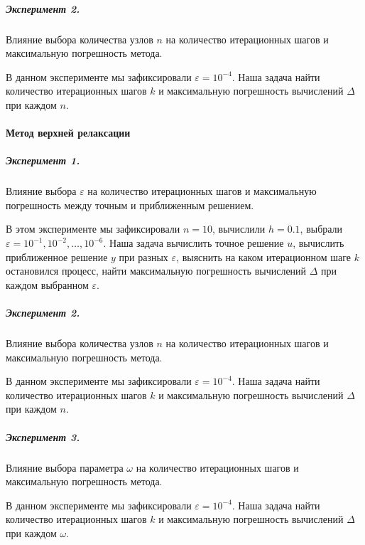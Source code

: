 \subparagraph{Эксперимент 2.}

Влияние выбора количества узлов $n$ на количество итерационных шагов и максимальную погрешность метода.

В данном эксперименте мы зафиксировали $\varepsilon = 10^{-4}$. Наша задача найти количество итерационных шагов $k$ и максимальную погрешность вычислений $\Delta$ при каждом $n$.



\newpage
\paragraph{Метод верхней релаксации}

\subparagraph{Эксперимент 1.}

Влияние выбора $\varepsilon$ на количество итерационных шагов и максимальную погрешность между точным и приближенным решением.

В этом эксперименте мы зафиксировали $n = 10$, вычислили $h=0.1$, выбрали $\varepsilon = 10^{-1}, 10^{-2}, \dots, 10^{-6}$. Наша задача вычислить точное решение $u$, вычислить приближенное решение $y$ при разных $\varepsilon$, выяснить на каком итерационном шаге $k$  остановился процесс, найти максимальную погрешность вычислений $\Delta$ при каждом выбранном $\varepsilon$.



\subparagraph{Эксперимент 2.}

Влияние выбора количества узлов $n$ на количество итерационных шагов и максимальную погрешность метода.

В данном эксперименте мы зафиксировали $\varepsilon = 10^{-4}$. Наша задача найти количество итерационных шагов $k$ и максимальную погрешность вычислений $\Delta$ при каждом $n$.



\subparagraph{Эксперимент 3.}

Влияние выбора параметра $\omega$ на количество итерационных шагов и максимальную погрешность метода.

В данном эксперименте мы зафиксировали $\varepsilon = 10^{-4}$. Наша задача найти количество итерационных шагов $k$ и максимальную погрешность вычислений $\Delta$ при каждом $\omega$.

